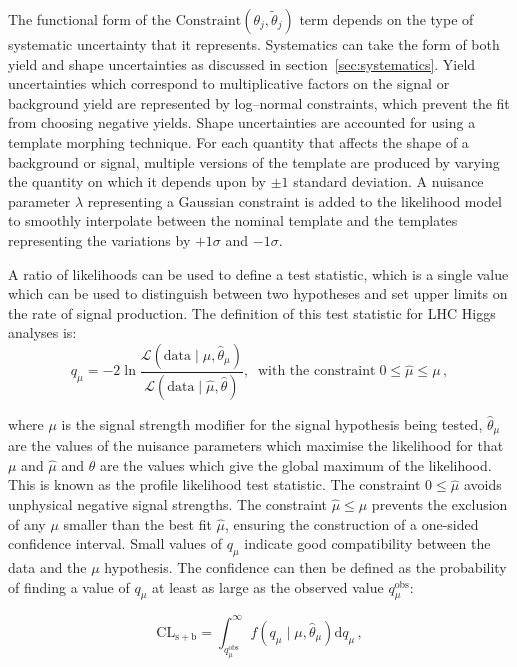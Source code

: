 The functional form of the $\mathrm{Constraint}(\theta_{j}, \tilde{\theta}_{j})$ 
term depends on the type of systematic uncertainty that it represents.
Systematics can take the form of both yield and shape uncertainties as discussed in
section~\ref{sec:systematics}. Yield uncertainties which correspond
to multiplicative factors on the signal or background yield are represented by
log--normal constraints, which prevent the fit from choosing negative yields. 
Shape uncertainties are accounted for using a template morphing technique. 
For each quantity that affects the shape of a background or signal,
multiple versions of the template are produced by varying the quantity on which it 
depends upon by $\pm 1$ standard deviation. A nuisance parameter $\lambda$
representing a Gaussian constraint is added to the likelihood model 
to smoothly interpolate between the nominal template
and the templates representing the variations by $+1 \sigma$ and $-1 \sigma$.

A ratio of likelihoods can be used to define a test statistic, which is a
single value which can be used to distinguish between two hypotheses and set
upper limits on the rate of signal production. The definition of this test
statistic for LHC Higgs analyses is: 
\begin{equation}
q_{\mu} = -2
\ln\frac{\mathcal{L}(\mathrm{data}\mid\mu,\hat{\theta}_{\mu})}{\mathcal{L}(\mathrm{data}\mid\hat{\mu},\hat{\theta})},
\;\; \text{with the constraint} \; 0\leq\hat{\mu}\leq\mu\, ,
\label{eq:ProfileLikelihood}
\end{equation}

where $\mu$ is the signal strength modifier for the signal hypothesis being tested, 
$\hat{\theta}_{\mu}$ are the values of the nuisance parameters which maximise the 
likelihood for that $\mu$ and $\hat{\mu}$ and $\hat{\theta}$ are the values which give the global maximum
of the likelihood. This is known as the profile likelihood test statistic. 
The constraint $0\leq\hat{\mu}$ avoids unphysical negative
signal strengths. The constraint $\hat{\mu}\leq\mu$ prevents the exclusion of
any $\mu$ smaller than the best fit $\hat{\mu}$, ensuring the
construction of a one-sided confidence interval. 
Small values of $q_{\mu}$ indicate good compatibility between
the data and the $\mu$ hypothesis. The confidence can then be defined as the
probability of finding a value of $q_{\mu}$ at least as large as the observed
value $q_{\mu}^{\mathrm{obs}}$: 

\begin{equation} \label{eqn:cl_splusb}
\mathrm{CL_{s+b}} =
\int_{q_{\mu}^{\mathrm{obs}}}^{\infty}f(q_{\mu}\mid\mu,\hat{\theta}_{\mu})\mathrm{d}q_{\mu}\,
,
\end{equation}


